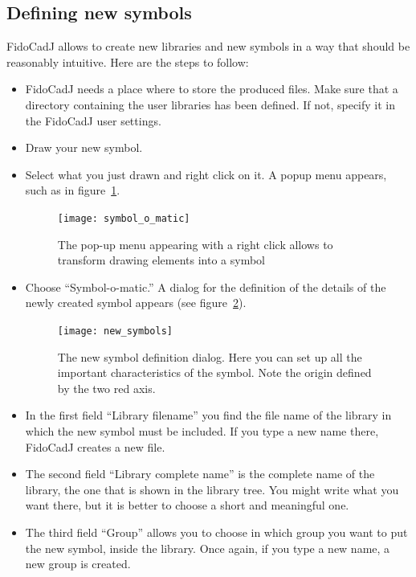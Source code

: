 \documentclass[10pt,a4paper,twoside]{scrreprt}
\begin{document}
\subsection{Defining new symbols}
FidoCadJ allows to create new libraries and new symbols in a way that should be reasonably intuitive. Here are the steps to follow:
\begin{itemize}
\item FidoCadJ needs a place where to store the produced files. Make sure that a directory containing the user libraries has been defined. If not, specify it in the FidoCadJ user settings.
\item Draw your new symbol.
\item Select what you just drawn and right click on it. A popup menu appears, such as in figure~\ref{fig_symbol_o_matic}.
\begin{figure}
  \begin{center}
    \texttt{[image: symbol\_o\_matic]}
  \end{center}
  \caption{The pop-up menu appearing with a right click allows to transform drawing elements into a symbol}
  \label{fig_symbol_o_matic}
\end{figure}
\item Choose ``Symbol-o-matic.'' A dialog for the definition of the details of the newly created symbol appears (see figure~\ref{fig_new_symbols}).
\begin{figure}
  \begin{center}
    \texttt{[image: new\_symbols]}
  \end{center}
  \caption{The new symbol definition dialog. Here you can set up all the important characteristics of the symbol. Note the origin defined by the two red axis.}
  \label{fig_new_symbols}
\end{figure}
\item In the first field ``Library filename'' you find the file name of the library in which the new symbol must be included. If you type a new name there, FidoCadJ creates a new file.
\item The second field ``Library complete name'' is the complete name of the library, the one that is shown in the library tree. You might write what you want there, but it is better to choose a short and meaningful one.
\item The third field ``Group'' allows you to choose in which group you want to put the new symbol, inside the library. Once again, if you type a new name, a new group is created.

\end{itemize}
\end{document}
